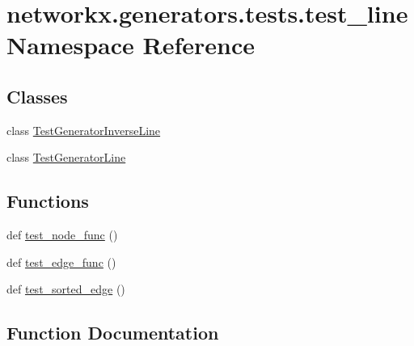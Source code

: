 \hypertarget{namespacenetworkx_1_1generators_1_1tests_1_1test__line}{}\section{networkx.\+generators.\+tests.\+test\+\_\+line Namespace Reference}
\label{namespacenetworkx_1_1generators_1_1tests_1_1test__line}
\subsection*{Classes}
\begin{DoxyCompactItemize}
\item 
class \hyperlink{classnetworkx_1_1generators_1_1tests_1_1test__line_1_1TestGeneratorInverseLine}{Test\+Generator\+Inverse\+Line}
\item 
class \hyperlink{classnetworkx_1_1generators_1_1tests_1_1test__line_1_1TestGeneratorLine}{Test\+Generator\+Line}
\end{DoxyCompactItemize}
\subsection*{Functions}
\begin{DoxyCompactItemize}
\item 
def \hyperlink{namespacenetworkx_1_1generators_1_1tests_1_1test__line_a94e223b4749686a4bc330ea4638c627e}{test\+\_\+node\+\_\+func} ()
\item 
def \hyperlink{namespacenetworkx_1_1generators_1_1tests_1_1test__line_a2ac192c05fbd4dcbf8bb208bb1531328}{test\+\_\+edge\+\_\+func} ()
\item 
def \hyperlink{namespacenetworkx_1_1generators_1_1tests_1_1test__line_aea69be3e51175871718dc3a2c25cf7a6}{test\+\_\+sorted\+\_\+edge} ()
\end{DoxyCompactItemize}


\subsection{Function Documentation}
\mbox{\label{namespacenetworkx_1_1generators_1_1tests_1_1test__line_a2ac192c05fbd4dcbf8bb208bb1531328}} 
